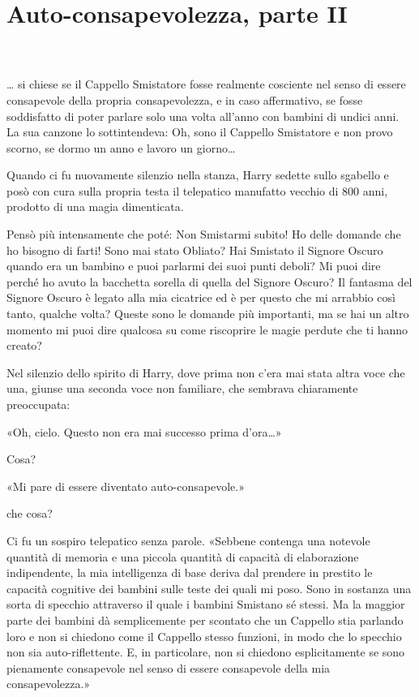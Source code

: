 
\chapter{Auto-consapevolezza, parte II}
\label{capitolo:10}

~\\
~\\

… si chiese se il Cappello Smistatore fosse realmente cosciente nel senso di essere consapevole della propria consapevolezza, e in caso affermativo, se fosse soddisfatto di poter parlare solo una volta all’anno con bambini di undici anni. La sua canzone lo sottintendeva: Oh, sono il Cappello Smistatore e non provo scorno, se dormo un anno e lavoro un giorno…

Quando ci fu nuovamente silenzio nella stanza, Harry sedette sullo sgabello e posò con cura sulla propria testa il telepatico manufatto vecchio di 800 anni, prodotto di una magia dimenticata.

Pensò più intensamente che poté: Non Smistarmi subito! Ho delle domande che ho bisogno di farti! Sono mai stato Obliato? Hai Smistato il Signore Oscuro quando era un bambino e puoi parlarmi dei suoi punti deboli? Mi puoi dire perché ho avuto la bacchetta sorella di quella del Signore Oscuro? Il fantasma del Signore Oscuro è legato alla mia cicatrice ed è per questo che mi arrabbio così tanto, qualche volta? Queste sono le domande più importanti, ma se hai un altro momento mi puoi dire qualcosa su come riscoprire le magie perdute che ti hanno creato?

Nel silenzio dello spirito di Harry, dove prima non c’era mai stata altra voce che una, giunse una seconda voce non familiare, che sembrava chiaramente preoccupata:

«Oh, cielo. Questo non era mai successo prima d’ora…»

Cosa?

«Mi pare di essere diventato auto-consapevole.»

che cosa?

Ci fu un sospiro telepatico senza parole. «Sebbene contenga una notevole quantità di memoria e una piccola quantità di capacità di elaborazione indipendente, la mia intelligenza di base deriva dal prendere in prestito le capacità cognitive dei bambini sulle teste dei quali mi poso. Sono in sostanza una sorta di specchio attraverso il quale i bambini Smistano sé stessi. Ma la maggior parte dei bambini dà semplicemente per scontato che un Cappello stia parlando loro e non si chiedono come il Cappello stesso funzioni, in modo che lo specchio non sia auto-riflettente. E, in particolare, non si chiedono esplicitamente se sono pienamente consapevole nel senso di essere consapevole della mia consapevolezza.»

